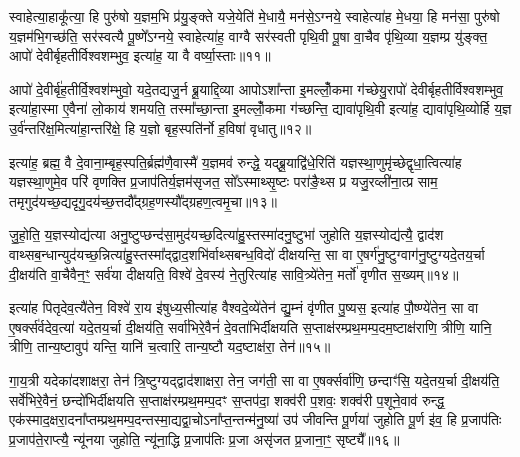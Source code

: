 स्वाहेत्या॒हाकू᳚त्या॒ हि पुरु॑षो य॒ज्ञम॒भि प्र॑यु॒ङ्क्ते यजे॒येति॑ मे॒धायै॒ मन॑से॒\-ऽग्नये॒ स्वाहेत्या॑ह मे॒धया॒ हि मन॑सा॒ पुरु॑षो य॒ज्ञम॑भि॒गच्छ॑ति॒ सर॑स्वत्यै पू॒ष्णे᳚\-ऽग्नये॒ स्वाहेत्या॑ह॒ वाग्वै सर॑स्वती पृथि॒वी पू॒षा वा॒चैव पृ॑थि॒व्या य॒ज्ञम्प्र यु॑ङ्क्त॒ आपो॑ देवीर्बृहतीर्विश्वशम्भुव॒ इत्या॑ह॒ या वै वर्ष्या॒स्ताः॥११॥

आपो॑ दे॒वीर्बृ॑ह॒तीर्वि॒श्वश॑म्भुवो॒ यदे॒तद्यजु॒र्न ब्रू॒याद्दि॒व्या आपो\-ऽशा᳚न्ता इ॒मल्लोँ॒कमा ग॑च्छेयु॒रापो॑ देवीर्बृहतीर्विश्वशम्भुव॒ इत्या॑हा॒स्मा ए॒वैना॑ लो॒काय॑ शमयति॒ तस्मा᳚च्छा॒न्ता इ॒मल्लोँ॒कमा ग॑च्छन्ति॒ द्यावा॑पृथि॒वी इत्या॑ह॒ द्यावा॑पृथि॒व्योर्\mbox{}हि य॒ज्ञ उ॒र्व॑न्तरि॑क्ष॒मित्या॑हा॒न्तरि॑क्षे॒ हि य॒ज्ञो बृह॒स्पति॑र्नो ह॒विषा॑ वृधातु॥१२॥

इत्या॑ह॒ ब्रह्म॒ वै दे॒वाना॒म्बृह॒स्पति॒र्ब्रह्म॑णै॒वास्मै॑ य॒ज्ञमव॑ रुन्द्धे॒ यद्ब्रू॒याद्वि॑धे॒रिति॑ यज्ञस्था॒णुमृ॑च्छेद्वृधा॒त्वित्या॑ह यज्ञस्था॒णुमे॒व परि॑ वृणक्ति प्र॒जाप॑तिर्य॒ज्ञम॑सृजत॒ सो᳚\-ऽस्माथ्सृ॒ष्टः परा॑ङै॒थ्स प्र यजु॒रव्ली॑ना॒त्प्र साम॒ तमृगुद॑यच्छ॒द्यदृगु॒दय॑च्छ॒त्तदौ᳚द्ग्रह॒णस्यौ᳚द्ग्रहण॒त्वमृ॒चा॥१३॥

जु॒हो॒ति॒ य॒ज्ञस्योद्य॑त्या अनु॒ष्टुप्छन्द॑सा॒मुद॑यच्छ॒दित्या॑हु॒स्तस्मा॑दनु॒ष्टुभा॑ जुहोति य॒ज्ञस्योद्य॑त्यै॒ द्वाद॑श वाथ्सब॒न्धान्युद॑यच्छ॒न्नित्या॑हु॒स्तस्मा᳚द्द्वाद॒शभि॑र्वाथ्सबन्ध॒विदो॑ दीक्षयन्ति॒ सा वा ए॒षर्ग॑नु॒ष्टुग्वाग॑नु॒ष्टुग्यदे॒तय॒र्चा दी॒क्षय॑ति वा॒चैवैन॒ꣳ॒ सर्व॑या दीक्षयति॒ विश्वे॑ दे॒वस्य॑ ने॒तुरित्या॑ह सावि॒त्र्ये॑तेन॒ मर्तो॑ वृणीत स॒ख्यम्॥१४॥

इत्या॑ह पितृदेव॒त्यै॑तेन॒ विश्वे॑ रा॒य इ॑षुध्य॒सीत्या॑ह वैश्वदे॒व्ये॑तेन॑ द्यु॒म्नं वृ॑णीत पु॒ष्यस॒ इत्या॑ह पौ॒ष्ण्ये॑तेन॒ सा वा ए॒षर्क्स॑र्वदेव॒त्या॑ यदे॒तय॒र्चा दी॒क्षय॑ति॒ सर्वा॑भिरे॒वैनं॑ दे॒वता॑भिर्दीक्षयति स॒प्ताक्ष॑रम्प्रथ॒मम्प॒दम॒ष्टाक्ष॑राणि॒ त्रीणि॒ यानि॒ त्रीणि॒ तान्य॒ष्टावुप॑ यन्ति॒ यानि॑ च॒त्वारि॒ तान्य॒ष्टौ यद॒ष्टाक्ष॑रा॒ तेन॑॥१५॥

गा॒य॒त्री यदेका॑दशाक्षरा॒ तेन॑ त्रि॒ष्टुग्यद्द्वाद॑शाक्षरा॒ तेन॒ जग॑ती॒ सा वा ए॒षर्क्सर्वा॑णि॒ छन्दाꣳ॑सि॒ यदे॒तय॒र्चा दी॒क्षय॑ति॒ सर्वे॑भिरे॒वैनं॒ छन्दो॑भिर्दीक्षयति स॒प्ताक्ष॑रम्प्रथ॒मम्प॒दꣳ स॒प्तप॑दा॒ शक्व॑री प॒शवः॒ शक्व॑री प॒शूने॒वाव॑ रुन्द्ध॒ एक॑स्माद॒क्षरा॒दना᳚प्तम्प्रथ॒मम्प॒दन्तस्मा॒द्यद्वा॒चो\-ऽना᳚प्त॒न्तन्म॑नु॒ष्या॑ उप॑ जीवन्ति पू॒र्णया॑ जुहोति पू॒र्ण इ॑व॒ हि प्र॒जाप॑तिः प्र॒जाप॑ते॒राप्त्यै॒ न्यू॑नया जुहोति॒ न्यू॑ना॒द्धि प्र॒जाप॑तिः प्र॒जा असृ॑जत प्र॒जाना॒ꣳ॒ सृष्ट्यै᳚॥१६॥

{\anuvakamend[{अ॒ग्नये॒ ता वृ॑धात्वृ॒चा स॒ख्यन्तेन॑ जुहोति॒ पञ्च॑दश च॥२॥}]}

